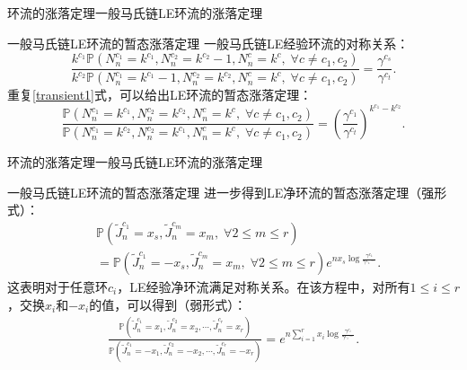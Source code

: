 \documentclass{beamer}
\newcommand{\Pnum}{\mathbb{P}}
\begin{document}
\begin{frame}{环流的涨落定理}{一般马氏链LE环流的涨落定理}
	\begin{block}{一般马氏链LE环流的暂态涨落定理}
		一般马氏链LE经验环流的对称关系：
		\begin{equation} \label{transient1}
			\frac{k^{c_1} \Pnum(N^{c_1}_n=k^{c_1},N^{c_2}_n=k^{c_2}-1,N^{c}_n=k^{c},\;\forall c\neq c_1,c_2)}
			{k^{c_2} \Pnum(N^{c_1}_n=k^{c_1} -1,N^{c_2}_n=k^{c_2},N^{c}_n=k^{c},\;\forall c\neq c_1,c_2)}
			= \frac{\gamma^{c_s}}{\gamma^{c_t}}.
		\end{equation}
		重复\ref{transient1}式，可以给出LE环流的暂态涨落定理：
		\begin{equation} \label{transient2}
			\frac{\Pnum(N^{c_1}_n=k^{c_1},N^{c_2}_n=k^{c_2},N^{c}_n=k^{c},\;\forall c\neq c_1,c_2)}
			{\Pnum(N^{c_1}_n=k^{c_2},N^{c_2}_n=k^{c_1},N^{c}_n=k^{c},\;\forall c\neq c_1,c_2)}
			= \left(\frac{\gamma^{c_1}}{\gamma^{c_t}}\right)^{k^{c_1}-k^{c_2}}.
		\end{equation}

	\end{block}
\end{frame}

\begin{frame}{环流的涨落定理}{一般马氏链LE环流的涨落定理}
	\begin{block}{一般马氏链LE环流的暂态涨落定理}
		进一步得到LE净环流的暂态涨落定理（强形式）：
		\begin{align*}
			 & \Pnum(\tilde{J}^{c_1}_n=x_s,\tilde{J}^{c_m}_n=x_m,\;\forall 2\le m \le r)                                                   \\
			 & = \Pnum(\tilde{J}^{c_1}_n=-x_s,\tilde{J}^{c_m}_n=x_m,\;\forall 2\le m \le r)e^{nx_s\log\frac{\gamma^{c_1}}{\gamma^{c_1-}}}.
		\end{align*}
		这表明对于任意环$c_i$，LE经验净环流满足对称关系。在该方程中，对所有$1\le i \le r$，交换$x_i$和$-x_i$的值，可以得到（弱形式）：
		\begin{equation*}\label{weak1}
			\begin{split}
				\frac{\Pnum\left(\tilde{J}^{c_1}_n=x_1,\tilde{J}^{c_2}_n=x_2,\cdots,\tilde{J}^{c_{r}}_n=x_{r}\right)}
				{\Pnum\left(\tilde{J}^{c_1}_n=-x_1,\tilde{J}^{c_2}_n=-x_2,\cdots,\tilde{J}^{c_{r}}_n=-x_{r}\right)}
				=e^{n\sum_{i=1}^{r}x_i\log\frac{\gamma^{c_i}}{\gamma^{c_i-}}}.
			\end{split}
		\end{equation*}
	\end{block}
\end{frame}
\end{document}
